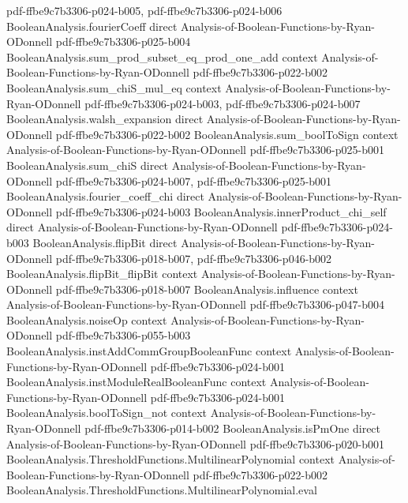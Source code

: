 \begin{theorem}
  {pdf-ffbe9c7b3306-p024-b005,
    pdf-ffbe9c7b3306-p024-b006}
\proofstep
  {BooleanAnalysis.fourierCoeff}
  {direct}
  {Analysis-of-Boolean-Functions-by-Ryan-ODonnell}
  {pdf-ffbe9c7b3306-p025-b004}
\proofstep
  {BooleanAnalysis.sum_prod_subset_eq_prod_one_add}
  {context}
  {Analysis-of-Boolean-Functions-by-Ryan-ODonnell}
  {pdf-ffbe9c7b3306-p022-b002}
\proofstep
  {BooleanAnalysis.sum_chiS_mul_eq}
  {context}
  {Analysis-of-Boolean-Functions-by-Ryan-ODonnell}
  {pdf-ffbe9c7b3306-p024-b003,
    pdf-ffbe9c7b3306-p024-b007}
\proofstep
  {BooleanAnalysis.walsh_expansion}
  {direct}
  {Analysis-of-Boolean-Functions-by-Ryan-ODonnell}
  {pdf-ffbe9c7b3306-p022-b002}
\proofstep
  {BooleanAnalysis.sum_boolToSign}
  {context}
  {Analysis-of-Boolean-Functions-by-Ryan-ODonnell}
  {pdf-ffbe9c7b3306-p025-b001}
\proofstep
  {BooleanAnalysis.sum_chiS}
  {direct}
  {Analysis-of-Boolean-Functions-by-Ryan-ODonnell}
  {pdf-ffbe9c7b3306-p024-b007,
    pdf-ffbe9c7b3306-p025-b001}
\proofstep
  {BooleanAnalysis.fourier_coeff_chi}
  {direct}
  {Analysis-of-Boolean-Functions-by-Ryan-ODonnell}
  {pdf-ffbe9c7b3306-p024-b003}
\proofstep
  {BooleanAnalysis.innerProduct_chi_self}
  {direct}
  {Analysis-of-Boolean-Functions-by-Ryan-ODonnell}
  {pdf-ffbe9c7b3306-p024-b003}
\proofstep
  {BooleanAnalysis.flipBit}
  {direct}
  {Analysis-of-Boolean-Functions-by-Ryan-ODonnell}
  {pdf-ffbe9c7b3306-p018-b007,
    pdf-ffbe9c7b3306-p046-b002}
\proofstep
  {BooleanAnalysis.flipBit_flipBit}
  {context}
  {Analysis-of-Boolean-Functions-by-Ryan-ODonnell}
  {pdf-ffbe9c7b3306-p018-b007}
\proofstep
  {BooleanAnalysis.influence}
  {context}
  {Analysis-of-Boolean-Functions-by-Ryan-ODonnell}
  {pdf-ffbe9c7b3306-p047-b004}
\proofstep
  {BooleanAnalysis.noiseOp}
  {context}
  {Analysis-of-Boolean-Functions-by-Ryan-ODonnell}
  {pdf-ffbe9c7b3306-p055-b003}
\proofstep
  {BooleanAnalysis.instAddCommGroupBooleanFunc}
  {context}
  {Analysis-of-Boolean-Functions-by-Ryan-ODonnell}
  {pdf-ffbe9c7b3306-p024-b001}
\proofstep
  {BooleanAnalysis.instModuleRealBooleanFunc}
  {context}
  {Analysis-of-Boolean-Functions-by-Ryan-ODonnell}
  {pdf-ffbe9c7b3306-p024-b001}
\proofstep
  {BooleanAnalysis.boolToSign_not}
  {context}
  {Analysis-of-Boolean-Functions-by-Ryan-ODonnell}
  {pdf-ffbe9c7b3306-p014-b002}
\proofstep
  {BooleanAnalysis.isPmOne}
  {direct}
  {Analysis-of-Boolean-Functions-by-Ryan-ODonnell}
  {pdf-ffbe9c7b3306-p020-b001}
\proofstep
  {BooleanAnalysis.ThresholdFunctions.MultilinearPolynomial}
  {context}
  {Analysis-of-Boolean-Functions-by-Ryan-ODonnell}
  {pdf-ffbe9c7b3306-p022-b002}
\proofstep
  {BooleanAnalysis.ThresholdFunctions.MultilinearPolynomial.eval}

\end{theorem}
